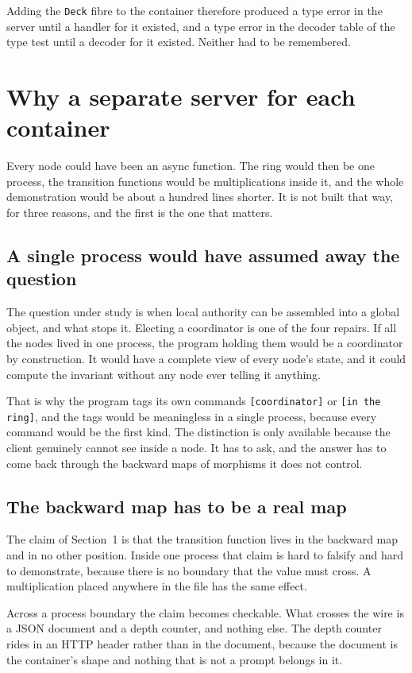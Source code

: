 \documentclass[11pt,a4paper]{article}
\begin{document}
Adding the \verb|Deck| fibre to the container therefore produced a type error in the
server until a handler for it existed, and a type error in the decoder table of the
type test until a decoder for it existed. Neither had to be remembered.

\section{Why a separate server for each container}

Every node could have been an async function. The ring would then be one process, the
transition functions would be multiplications inside it, and the whole demonstration
would be about a hundred lines shorter. It is not built that way, for three reasons,
and the first is the one that matters.

\subsection{A single process would have assumed away the question}

The question under study is when local authority can be assembled into a global
object, and what stops it. Electing a coordinator is one of the four repairs. If all
the nodes lived in one process, the program holding them would be a coordinator by
construction. It would have a complete view of every node's state, and it could
compute the invariant without any node ever telling it anything.

That is why the program tags its own commands \verb|[coordinator]| or
\verb|[in the ring]|, and the tags would be meaningless in a single process, because
every command would be the first kind. The distinction is only available because the
client genuinely cannot see inside a node. It has to ask, and the answer has to come
back through the backward maps of morphisms it does not control.

\subsection{The backward map has to be a real map}

The claim of Section~1 is that the transition function lives in the backward map and
in no other position. Inside one process that claim is hard to falsify and hard to
demonstrate, because there is no boundary that the value must cross. A multiplication
placed anywhere in the file has the same effect.

Across a process boundary the claim becomes checkable. What crosses the wire is a
JSON document and a depth counter, and nothing else. The depth counter rides in an
HTTP header rather than in the document, because the document is the container's shape
and nothing that is not a prompt belongs in it.
\end{document}
